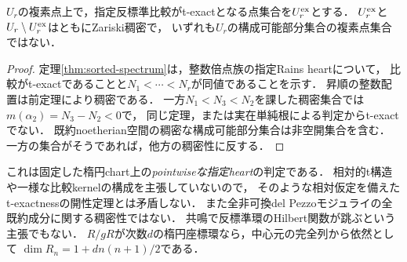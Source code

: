 \begin{corollary}[一致・不一致の双方の稠密性]\label{cor:nonconstructible-texact}
$U_r$の複素点上で，指定反標準比較がt-exactとなる点集合を$U_r^{\rm ex}$とする．
$U_r^{\rm ex}$と$U_r\setminus U_r^{\rm ex}$はともにZariski稠密で，
いずれも$U_r$の構成可能部分集合の複素点集合ではない．
\end{corollary}
\begin{proof}
定理\ref{thm:sorted-spectrum}は，整数倍点族の指定Rains heartについて，
比較がt-exactであることと$N_1<\cdots<N_r$が同値であることを示す．
昇順の整数配置は前定理により稠密である．
一方$N_1<N_3<N_2$を課した稠密集合では$m(\alpha_2)=N_3-N_2<0$で，
同じ定理，または実在単純根による判定からt-exactでない．
既約noetherian空間の稠密な構成可能部分集合は非空開集合を含む．
一方の集合がそうであれば，他方の稠密性に反する．
\end{proof}

\begin{remark}[稠密性の範囲]
これは固定した楕円chart上の\emph{pointwiseな指定heart}の判定である．
相対的t構造や一様な比較kernelの構成を主張していないので，
そのような相対仮定を備えたt-exactnessの開性定理とは矛盾しない．
また全非可換del Pezzoモジュライの全既約成分に関する稠密性ではない．
共鳴で反標準環のHilbert関数が跳ぶという主張でもない．
$R/gR$が次数$d$の楕円座標環なら，中心元の完全列から依然として
$\dim R_n=1+dn(n+1)/2$である．
\end{remark}
